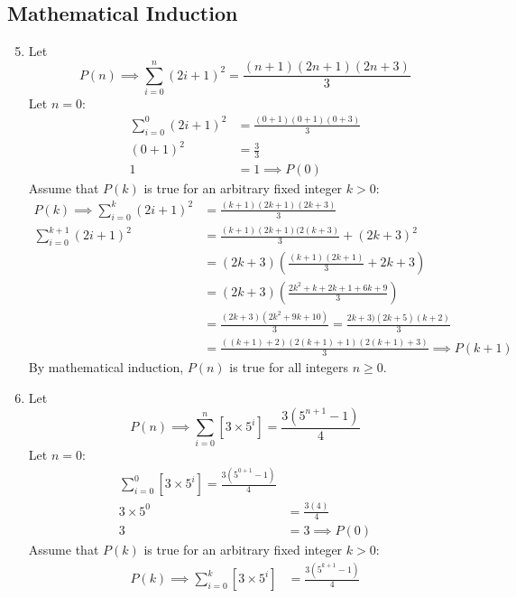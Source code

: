 \documentclass[12pt, A4]{article}
\begin{document}
		\subsection{Mathematical Induction}
			\begin{enumerate}
				\setcounter{enumi}{4}
				\item
					Let
						\[P(n) \implies \sum_{i = 0}^{n}(2i + 1)^2 = \frac{(n + 1)(2n + 1)(2n + 3)}{3}\]
						Let \(n = 0\):
						\begin{align*}
							\sum_{i = 0}^0(2i + 1)^2 &= \frac{(0 + 1)(0 + 1)(0 + 3)}{3} \\
							(0 + 1)^2 &= \frac{3}{3} \\
							1 &= 1 \implies P(0)
						\end{align*}
						Assume that \(P(k)\) is true for an arbitrary fixed integer \(k > 0\):
						\begin{align*}
							P(k) \implies \sum_{i = 0}^k(2i + 1)^2 &= \frac{(k + 1)(2k + 1)(2k + 3)}{3} \\
							\sum_{i = 0}^{k + 1}(2i + 1)^2 &= \frac{(k + 1)(2k + 1)(2(k + 3)}{3} + (2k + 3)^2 \\
								&= (2k + 3)\left(\frac{(k + 1)(2k + 1)}{3} + 2k + 3\right) \\
								&= (2k + 3)\left(\frac{2k^2 + k + 2k + 1 + 6k + 9}{3}\right) \\
								&= \frac{(2k + 3)(2k^2 + 9k + 10)}{3}
										=  \frac{2k + 3)(2k + 5)(k + 2)}{3} \\
								&= \frac{((k + 1) + 2)(2(k + 1) + 1)(2(k + 1) + 3)}{3}
										\implies P(k + 1)
						\end{align*}
						By mathematical induction, \(P(n)\) is true for all integers \(n \ge 0\).
				\setcounter{enumi}{6}
				\item
					Let
						\[P(n) \implies \sum_{i = 0}^n\left[3 \times 5^i\right] = \frac{3\left(5^{n + 1} - 1\right)}{4}\]
						Let \(n = 0\):
						\begin{align*}
							\sum_{i = 0}^0\left[3 \times 5^i\right] = \frac{3\left(5^{0 + 1} - 1\right)}{4} \\
							3 \times 5^0 &= \frac{3(4)}{4} \\
							3 &= 3 \implies P(0)
						\end{align*}
						Assume that \(P(k)\) is true for an arbitrary fixed integer \(k > 0\):
						\begin{align*}
							P(k) \implies \sum_{i = 0}^k\left[3 \times 5^i\right] &= \frac{3\left(5^{k + 1} - 1\right)}{4} \\

\end{align*}
\end{enumerate}
\end{document}
